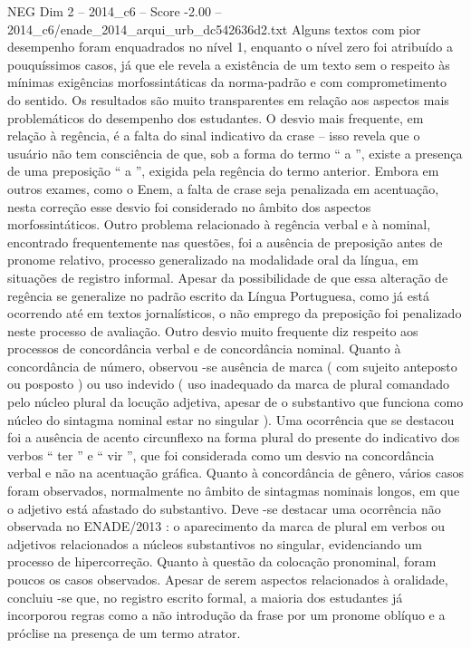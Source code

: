 \begin{textsample}{NEG Dim 2 – 2014\_c6 – Score -2.00 – 2014\_c6/enade\_2014\_arqui\_urb\_dc542636d2.txt}
Alguns textos com pior desempenho foram enquadrados no nível 1, enquanto o nível zero foi atribuído a pouquíssimos casos, já que ele revela a existência de um texto sem o respeito às mínimas exigências morfossintáticas da norma-padrão e com comprometimento do sentido.
Os resultados são muito transparentes em relação aos aspectos mais problemáticos do desempenho dos estudantes.
O desvio mais frequente, em relação à regência, é a falta do sinal indicativo da crase – isso revela que o usuário não tem consciência de que, sob a forma do termo “ a ”, existe a presença de uma preposição “ a ”, exigida pela regência do termo anterior.
Embora em outros exames, como o Enem, a falta de crase seja penalizada em acentuação, nesta correção esse desvio foi considerado no âmbito dos aspectos morfossintáticos.
Outro problema relacionado à regência verbal e à nominal, encontrado frequentemente nas questões, foi a ausência de preposição antes de pronome relativo, processo generalizado na modalidade oral da língua, em situações de registro informal.
Apesar da possibilidade de que essa alteração de regência se generalize no padrão escrito da Língua Portuguesa, como já está ocorrendo até em textos jornalísticos, o não emprego da preposição foi penalizado neste processo de avaliação.
Outro desvio muito frequente diz respeito aos processos de concordância verbal e de concordância nominal.
Quanto à concordância de número, observou -se ausência de marca ( com sujeito anteposto ou posposto ) ou uso indevido ( uso inadequado da marca de plural comandado pelo núcleo plural da locução adjetiva, apesar de o substantivo que funciona como núcleo do sintagma nominal estar no singular ).
Uma ocorrência que se destacou foi a ausência de acento circunflexo na forma plural do presente do indicativo dos verbos “ ter ” e “ vir ”, que foi considerada como um desvio na concordância verbal e não na acentuação gráfica.
Quanto à concordância de gênero, vários casos foram observados, normalmente no âmbito de sintagmas nominais longos, em que o adjetivo está afastado do substantivo.
Deve -se destacar uma ocorrência não observada no ENADE/2013 : o aparecimento da marca de plural em verbos ou adjetivos relacionados a núcleos substantivos no singular, evidenciando um processo de hipercorreção.
Quanto à questão da colocação pronominal, foram poucos os casos observados.
Apesar de serem aspectos relacionados à oralidade, concluiu -se que, no registro escrito formal, a maioria dos estudantes já incorporou regras como a não introdução da frase por um pronome oblíquo e a próclise na presença de um termo atrator.

\end{textsample}
